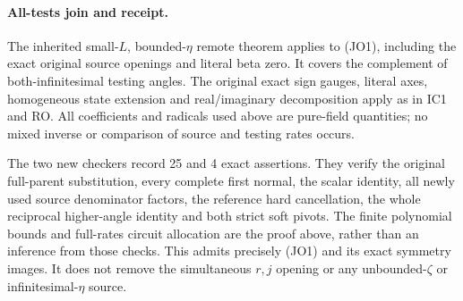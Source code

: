 \paragraph{All-tests join and receipt.}
The inherited small-$L$, bounded-$\eta$ remote theorem applies to
(JO1), including the exact original source openings and literal beta
zero. It covers the complement of both-infinitesimal testing angles.
The original exact sign gauges, literal axes, homogeneous state
extension and real/imaginary decomposition apply as in IC1 and RO.
All coefficients and radicals used above are pure-field quantities;
no mixed inverse or comparison of source and testing rates occurs.

The two new checkers record 25 and 4 exact assertions. They verify
the original full-parent substitution, every complete first normal,
the scalar identity, all newly used source denominator factors,
the reference hard cancellation, the whole reciprocal higher-angle
identity and both strict soft pivots. The finite polynomial bounds
and full-rates circuit allocation are the proof above, rather than
an inference from those checks. This admits precisely (JO1) and its
exact symmetry images. It does not remove the simultaneous
$r,j$ opening or any unbounded-$\zeta$ or infinitesimal-$\eta$ source.
